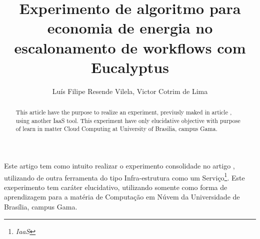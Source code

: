 \documentclass[12pt]{article}
\title{Experimento de algoritmo para economia de energia no\\
 escalonamento de workflows com Eucalyptus}
\author{Luís Filipe Resende Vilela\inst{1}, Victor Cotrim de Lima\inst{1}}
\begin{document}
\maketitle

\begin{abstract}
  This article have the purpose to realize an experiment, previusly maked in article \cite{elaine_et_al:14}, using another IaaS tool. This experiment have only elucidative objective with purpose of learn in matter Cloud Computing at University of Brasilia, campus Gama.
\end{abstract}

\begin{resumo}
  Este artigo tem como intuito realizar o experimento consolidade no artigo \cite{elaine_et_al:14}, utilizando de outra ferramenta do tipo Infra-estrutura como um Serviço\footnote{\textit{IaaS}}. Este exeperimento tem caráter elucidativo, utilizando somente como forma de aprendizagem para a matéria de Computação em Núvem da Universidade de Brasília, campus Gama.

\end{resumo}







\end{document}
